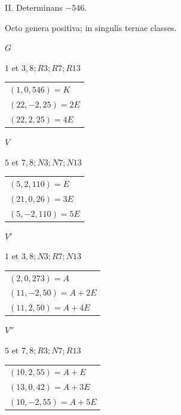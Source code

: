 \begin{center}II. Determinans \(-546\).\par\smallskip Octo genera positiva; in singulis ternae classes.\end{center}
\begin{center}
\begin{minipage}[t]{0.47\linewidth}\centering
\(G\)\par\smallskip
{\small \(1\text{ et }3, 8; R3; R7; R13\)}\par\smallskip
\begin{tabular}{@{}l@{}}
\((1,0,546)=K\)\\\((22,-2,25)=2E\)\\\((22,2,25)=4E\)
\end{tabular}
\end{minipage}\hfill\begin{minipage}[t]{0.47\linewidth}\centering
\(V\)\par\smallskip
{\small \(5\text{ et }7, 8; N3; N7; N13\)}\par\smallskip
\begin{tabular}{@{}l@{}}
\((5,2,110)=E\)\\\((21,0,26)=3E\)\\\((5,-2,110)=5E\)
\end{tabular}
\end{minipage}
\end{center}
\begin{center}
\begin{minipage}[t]{0.47\linewidth}\centering
\(V'\)\par\smallskip
{\small \(1\text{ et }3, 8; N3; R7; N13\)}\par\smallskip
\begin{tabular}{@{}l@{}}
\((2,0,273)=A\)\\\((11,-2,50)=A+2E\)\\\((11,2,50)=A+4E\)
\end{tabular}
\end{minipage}\hfill\begin{minipage}[t]{0.47\linewidth}\centering
\(V''\)\par\smallskip
{\small \(5\text{ et }7, 8; R3; N7; R13\)}\par\smallskip
\begin{tabular}{@{}l@{}}
\((10,2,55)=A+E\)\\\((13,0,42)=A+3E\)\\\((10,-2,55)=A+5E\)
\end{tabular}
\end{minipage}
\end{center}
